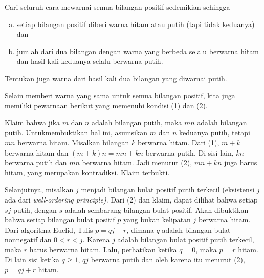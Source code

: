 \documentclass[12pt]{scrartcl}
\begin{document}
\begin{soaljawab}
    Cari seluruh cara mewarnai semua bilangan positif sedemikian sehingga 
    \begin{enumerate}[(a)]
        \item setiap bilangan positif diberi warna hitam atau putih (tapi tidak keduanya) dan \item jumlah dari dua bilangan dengan warna yang berbeda selalu berwarna hitam dan hasil kali keduanya selalu berwarna putih.
    \end{enumerate}
     
    Tentukan juga warna dari hasil kali dua bilangan yang diwarnai putih.

    \begin{solusi}
        Selain memberi warna yang sama untuk semua bilangan positif, kita juga memiliki pewarnaan berikut yang memenuhi kondisi (1) dan (2). 
        
        Klaim bahwa jika $m$ dan $n$ adalah bilangan putih, maka $mn$ adalah bilangan putih. Untukmembuktikan hal ini, asumsikan $m$ dan $n$ keduanya putih, tetapi $mn$ berwarna hitam. Misalkan bilangan $k$ berwarna hitam. Dari (1), $m+k$ berwarna hitam dan $(m+k)n = mn+kn$ berwarna putih. Di sisi lain, $kn$ berwarna putih dan $mn$ berwarna hitam. Jadi menurut (2), $mn+kn$ juga harus hitam, yang merupakan kontradiksi. Klaim terbukti.
        
        Selanjutnya, misalkan $j$ menjadi bilangan bulat positif putih terkecil (eksistensi $j$ ada dari \textit{well-ordering principle)}. Dari (2) dan klaim, dapat dilihat bahwa setiap $sj$ putih, dengan $s$ adalah sembarang bilangan bulat positif. Akan dibuktikan bahwa setiap bilangan bulat positif $p$ yang bukan kelipatan $j$ berwarna hitam. Dari algoritma Euclid, Tulis $p = qj+r$, dimana $q$ adalah bilangan bulat nonnegatif dan $0 < r < j$. Karena $j$ adalah bilangan bulat positif putih terkecil, maka $r$ harus berwarna hitam. Lalu, perhatikan ketika $q = 0$, maka $p = r$ hitam. Di lain sisi ketika $q \ge 1$, $qj$ berwarna putih dan oleh karena itu menurut (2), $p = qj+r$ hitam.
    \end{solusi}
\end{soaljawab}
\end{document}
